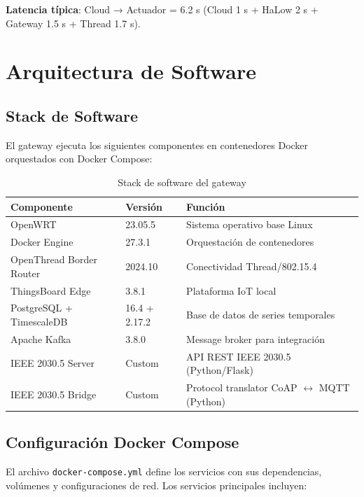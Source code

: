 \textbf{Latencia típica}: Cloud → Actuador = 6.2 s (Cloud 1 s + HaLow 2 s + Gateway 1.5 s + Thread 1.7 s).

\section{Arquitectura de Software}

\subsection{Stack de Software}

El gateway ejecuta los siguientes componentes en contenedores Docker orquestados con Docker Compose:

\begin{table}[h]
\centering
\caption{Stack de software del gateway}
\begin{tabular}{|l|l|p{6cm}|}
\hline
\textbf{Componente} & \textbf{Versión} & \textbf{Función} \\ \hline
OpenWRT & 23.05.5 & Sistema operativo base Linux \\ \hline
Docker Engine & 27.3.1 & Orquestación de contenedores \\ \hline
OpenThread Border Router & 2024.10 & Conectividad Thread/802.15.4 \\ \hline
ThingsBoard Edge & 3.8.1 & Plataforma IoT local \\ \hline
PostgreSQL + TimescaleDB & 16.4 + 2.17.2 & Base de datos de series temporales \\ \hline
Apache Kafka & 3.8.0 & Message broker para integración \\ \hline
IEEE 2030.5 Server & Custom & API REST IEEE 2030.5 (Python/Flask) \\ \hline
IEEE 2030.5 Bridge & Custom & Protocol translator CoAP $\leftrightarrow$ MQTT (Python) \\ \hline
\end{tabular}
\end{table}

\subsection{Configuración Docker Compose}

El archivo \texttt{docker-compose.yml} define los servicios con sus dependencias, volúmenes y configuraciones de red. Los servicios principales incluyen:

